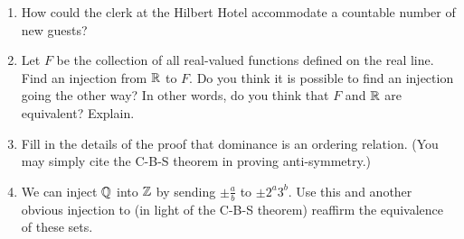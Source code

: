 \begin{enumerate}
\item How could the clerk at the Hilbert Hotel accommodate a countable
number of new guests?

\wbvfill

\item Let $F$ be the collection of all real-valued functions 
defined on the real line.  Find an injection from ${\mathbb R}$ to $F$.  Do you 
think it is possible to find an injection going the other way?  In 
other words, do you think that $F$ and ${\mathbb R}$ are equivalent?  Explain.

\wbvfill

\workbookpagebreak

\item Fill in the details of the proof that dominance is an ordering relation.
(You may simply cite the C-B-S theorem in proving anti-symmetry.)

\wbvfill

\item We can inject ${\mathbb Q}$ into ${\mathbb Z}$ by sending 
$\displaystyle \pm \frac{a}{b}$ to $\displaystyle \pm 2^a3^b$.  
 Use this and another obvious injection to (in light of the C-B-S 
theorem) reaffirm the equivalence of these sets.

\wbvfill

\end{enumerate}


